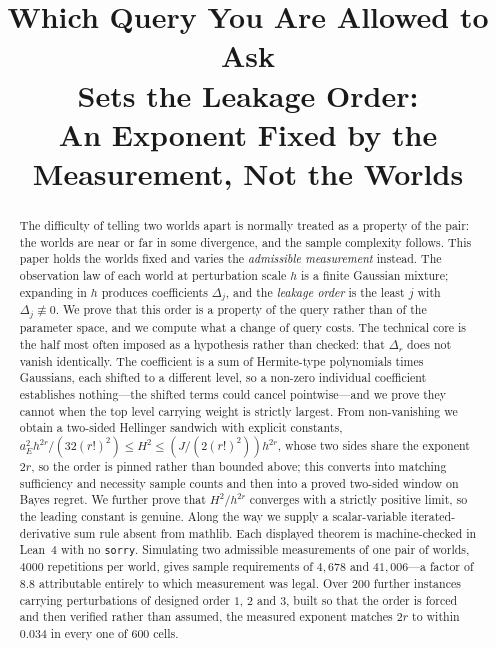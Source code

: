 \documentclass[conference]{IEEEtran}
\theoremstyle{definition}
\begin{document}
\title{Which Query You Are Allowed to Ask\\
Sets the Leakage Order:\\
An Exponent Fixed by the Measurement, Not the Worlds}

\author{
}

\maketitle

\begin{abstract}
The difficulty of telling two worlds apart is normally treated as a property of the pair:
the worlds are near or far in some divergence, and the sample complexity follows. This
paper holds the worlds fixed and varies the \emph{admissible measurement} instead. The
observation law of each world at perturbation scale $h$ is a finite Gaussian mixture;
expanding in $h$ produces coefficients $\Delta_{j}$, and the \emph{leakage order} is the
least $j$ with $\Delta_{j}\not\equiv0$. We prove that this order is a property of the query
rather than of the parameter space, and we compute what a change of query costs. The
technical core is the half most often imposed as a hypothesis rather than checked: that
$\Delta_{r}$ does not vanish
identically. The coefficient is a sum of Hermite-type polynomials times Gaussians, each
shifted to a different level, so a non-zero individual coefficient establishes nothing---the
shifted terms could cancel pointwise---and we prove they cannot when the top level carrying
weight is strictly largest. From non-vanishing we obtain a two-sided Hellinger sandwich with
explicit constants, $a_{E}^{2}h^{2r}/(32(r!)^{2})\le H^{2}\le(J/(2(r!)^{2}))h^{2r}$, whose two sides share the
exponent $2r$, so the order is pinned rather than bounded above; this converts into matching
sufficiency and necessity sample counts and then into a proved two-sided window on Bayes
regret. We further prove that $H^{2}/h^{2r}$ converges with a strictly positive limit, so
the leading constant is genuine. Along the way we supply a scalar-variable
iterated-derivative sum rule absent from mathlib. Each displayed theorem is machine-checked
in Lean~4 with no \texttt{sorry}. Simulating two admissible measurements of one pair of
worlds, $4000$ repetitions per world, gives sample requirements of $4{,}678$ and
$41{,}006$---a factor of $8.8$ attributable entirely to which measurement was legal. Over
$200$ further instances carrying perturbations of designed order $1$, $2$ and $3$, built so
that the order is forced and then verified rather than assumed, the measured exponent matches
$2r$ to within $0.034$ in every one of $600$ cells.
\end{abstract}
\end{document}
